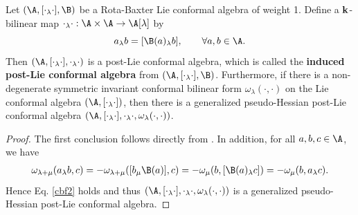 \documentclass[12pt]{amsart}
\begin{document}
\begin{proposition}\label{pp-rb-pl}
Let $(\A,[\cdot_\lambda\cdot],\B)$ be a Rota-Baxter Lie
conformal algebra of weight 1. Define a ${\bf k}$-bilinear map
$\cdot_\lambda\cdot:\A\times \A \rightarrow \A[\lambda]$ by
\begin{equation*}
    a_\lambda b=[\B (a)_\lambda b],\qquad \forall a,b\in \A.
\end{equation*}
Then $(\A,[\cdot_\lambda\cdot],\cdot_\lambda\cdot)$ is a post-Lie conformal algebra, which is called the {\bf induced post-Lie conformal algebra} from   $(\A,[\cdot_\lambda\cdot],\B)$. Furthermore, if there is a non-degenerate symmetric invariant conformal bilinear form $\omega_\lambda(\cdot,\cdot)$ on the Lie conformal algebra $(\A,[\cdot_\lambda\cdot])$, then there is a  generalized pseudo-Hessian post-Lie conformal algebra  $(\A,[\cdot_\lambda\cdot], \cdot_\lambda\cdot, \omega_\lambda(\cdot,\cdot)) $.
\end{proposition}
\begin{proof}
The first conclusion follows directly from \cite{YT}.  
In addition, for all $a,b,c\in \A$, we have
\begin{align*}
    \omega_{\lambda+\mu}(a_\lambda b,c)=-\omega_{\lambda+\mu}([b_\mu \B(a)],c)=-\omega_{\mu}(b,[\B(a)_\lambda c]) =-\omega_\mu(b,a_\lambda
    c).
\end{align*}
Hence Eq. \eqref{cbf2} holds and thus
$(\A,[\cdot_\lambda\cdot],\cdot_\lambda\cdot,
\omega_\lambda(\cdot,\cdot)) $ is a generalized pseudo-Hessian
post-Lie conformal algebra.
\end{proof}
\end{document}
